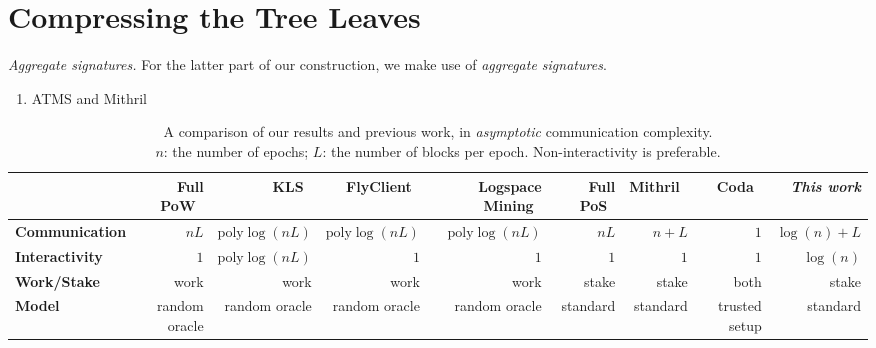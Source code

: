 \section{Compressing the Tree Leaves}\label{sec.compression}

\noindent
\emph{Aggregate signatures.}
For the latter part of our construction, we make use of \emph{aggregate signatures}.

\begin{enumerate}
  \item ATMS and Mithril
\end{enumerate}

\begin{table*}[t]
  \centering
  \begin{tabular}{|l|r|r|r|r|r|r|r|r|}
  \hline
  \multicolumn{1}{|r|}{}      & \textbf{Full PoW}~\cite{backbone}& \textbf{KLS}~\cite{popow}& \textbf{FlyClient}~\cite{flyclient}   & \textbf{Logspace Mining}~\cite{logspace} & \textbf{Full PoS}~\cite{ouroboros} & \textbf{Mithril}~\cite{mithril} & \textbf{Coda}~\cite{coda}  & \textit{This work} \\ \hline
  \textbf{Communication}      & $nL$                             & $\text{poly}\log(nL)$    & $\text{poly}\log(nL)$                 & $\text{poly}\log(nL)$                    & $nL$                               & $n + L$                         & $1$                        & $\log(n) + L$      \\ \hline
  \textbf{Interactivity}      & $1$                              & $\text{poly}\log(nL)$    & $1$                                   & $1$                                      & $1$                                & $1$                             & $1$                        & $\log(n)$          \\ \hline
  \textbf{Work/Stake}         & work                             & work                     & work                                  & work                                     & stake                              & stake                           & both                       & stake              \\ \hline
  \textbf{Model}              & random oracle                    & random oracle            & random oracle                         & random oracle                            & standard                           & standard                        & trusted setup              & standard           \\ \hline
  \end{tabular}
  \vspace{0.5em}
  \caption{A comparison of our results and previous work, in \emph{asymptotic} communication complexity.\\
           $n$: the number of epochs; $L$: the number of blocks per epoch. Non-interactivity is preferable.}
  \label{tab.comparison}
\end{table*}
